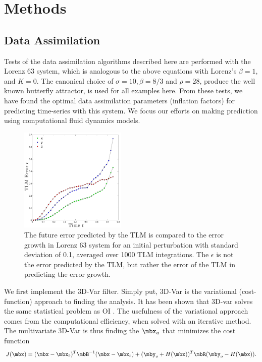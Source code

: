 \section{Methods}

\subsection{Data Assimilation}

Tests of the data assimilation algorithms described here are performed with the Lorenz 63 system, which is analogous to the above equations with Lorenz's $\beta = 1$, and $K = 0$.
The canonical choice of $\sigma = 10, \beta = 8/3$ and $\rho = 28$, produce the well known butterfly attractor, is used for all examples here.
From these tests, we have found the optimal data assimilation parameters (inflation factors) for predicting time-series with this system.
We focus our efforts on making prediction using computational fluid dynamics models.


\begin{figure}[t]
  \centering
  \includegraphics[width=0.45\textwidth]{figures/TLM-verification003_noname.pdf}
  \caption[The future error predicted by the TLM is compared to the error growth in Lorenz 63 system for an initial perturbation with standard deviation of 0.1, averaged over 1000 TLM integrations]{
    The future error predicted by the TLM is compared to the error growth in Lorenz 63 system for an initial perturbation with standard deviation of 0.1, averaged over 1000 TLM integrations.
    The $\epsilon$ is not the error predicted by the TLM, but rather the error of the TLM in predicting the error growth.
  }
  \label{fig:TLMverification}
\end{figure}

We first implement the 3D-Var filter.
Simply put, 3D-Var is the variational (cost-function) approach to finding the analysis.
It has been shown that 3D-var solves the same statistical problem as OI \cite{lorenc1986analysis}.
The usefulness of the variational approach comes from the computational efficiency, when solved with an iterative method.
The multivariate 3D-Var is thus finding the $\mbx _a$ that minimizes the cost function
\begin{equation} J(\mbx) = (\mbx - \mbx_b) ^T \mbB ^{-1} (\mbx - \mbx_b) + (\mby_o + H(\mbx))^T\mbR (\mby_o - H(\mbx)) .\end{equation}



